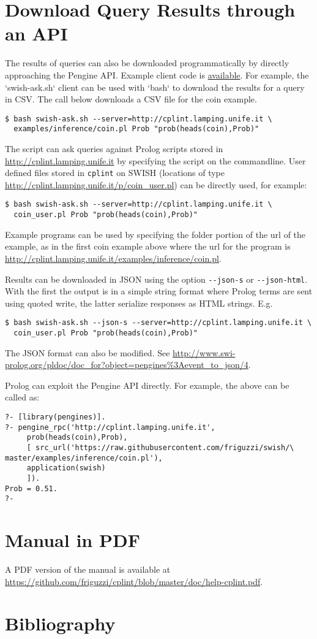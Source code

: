 \documentclass[a4paper,10pt]{scrartcl}
\begin{document}


\section{Download Query Results through an API}
The results of queries can also be downloaded programmatically by directly
approaching the Pengine API. Example client code is 
\href{https://github.com/friguzzi/swish/tree/master/client}{available}.  For example, the `swish-ask.sh` client
can be used with `bash` to download the results for a query in CSV.  The call
below downloads a CSV file for the coin example.
\begin{verbatim}
$ bash swish-ask.sh --server=http://cplint.lamping.unife.it \   
  examples/inference/coin.pl Prob "prob(heads(coin),Prob)"
\end{verbatim}
The script can ask queries against Prolog scripts stored in 
\url{http://cplint.lamping.unife.it} by specifying
the script on the commandline.  User defined files stored
in \texttt{cplint} on SWISH (locations of type
\url{http://cplint.lamping.unife.it/p/coin_user.pl}) can
be directly used, for example:
\begin{verbatim}
$ bash swish-ask.sh --server=http://cplint.lamping.unife.it \
  coin_user.pl Prob "prob(heads(coin),Prob)"
\end{verbatim}
Example programs can be used by specifying the folder portion of the url of the example,
as in the first coin example above where the url for the program is 
\url{http://cplint.lamping.unife.it/examples/inference/coin.pl}.

Results can be downloaded in JSON using the option \verb|--json-s| or
\verb|--json-html|.
With the first the output is in a simple string format where Prolog terms are sent using quoted write, the latter serialize responses as HTML strings. E.g.
\begin{verbatim}
$ bash swish-ask.sh --json-s --server=http://cplint.lamping.unife.it \
  coin_user.pl Prob "prob(heads(coin),Prob)"
\end{verbatim}
The JSON format can also be modified. See
\url{http://www.swi-prolog.org/pldoc/doc_for?object=pengines%3Aevent_to_json/4}.

Prolog can exploit the Pengine API directly.  For example, the above can
be called as:
\begin{verbatim}
?- [library(pengines)].
?- pengine_rpc('http://cplint.lamping.unife.it',
     prob(heads(coin),Prob),
     [ src_url('https://raw.githubusercontent.com/friguzzi/swish/\  
master/examples/inference/coin.pl'),
     application(swish)
     ]).
Prob = 0.51.
?-
\end{verbatim}

\section{Manual in PDF}
A PDF version of the manual is available at
\url{https://github.com/friguzzi/cplint/blob/master/doc/help-cplint.pdf}.
\section{Bibliography}


\end{document}
